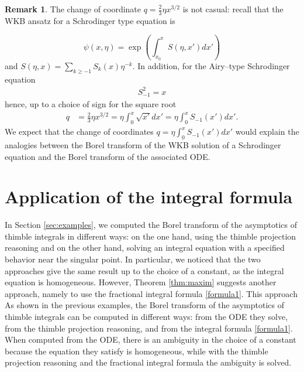 \documentclass{article}
\theoremstyle{definition}
\newtheorem{remark}[definition]{Remark}
\begin{document}
\begin{remark}
The change of coordinate $q=\frac{2}{3}\eta x^{3/2}$ is not casual: recall that the WKB ansatz for a Schrodinger type equation is

\begin{equation}
\psi(x,\eta)=\exp\left(\int_{x_0}^xS(\eta,x')dx'\right)
\end{equation} 
 and $S(\eta,x)=\sum_{k\geq -1}S_k(x)\eta^{-k}$. In addition, for the Airy--type Schrodinger equation 
 \begin{align*}
 S_{-1}^2=x
 \end{align*}
hence, up to a choice of sign for the square root
\begin{align*}
q&=\frac{2}{3}\eta x^{3/2}=\eta\int_0^x\sqrt{x'}dx'=\eta\int_{0}^xS_{-1}(x')dx'.
\end{align*}
We expect that the change of coordinates $q=\eta\int_0^{x}S_{-1}(x')dx'$ would explain the analogies between the Borel transform of the WKB solution of a Schrodinger equation and the Borel transform of the associated ODE.  
\end{remark} 

\section{Application of the integral formula}

In Section \ref{sec:examples}, we computed the Borel transform of the asymptotics of thimble integrals in different ways: on the one hand, using the thimble projection reasoning and on the other hand, solving an integral equation with a specified behavior near the singular point. In particular, we noticed that the two approaches give the same result up to the choice of a constant, as the integral equation is homogeneous. However, Theorem \ref{thm:maxim} suggests another approach, namely to use the fractional integral formula \eqref{formula1}. This approach  
As shown in the previous examples, the Borel transform  of the asymptotics of thimble integrals can be computed in different ways: from the ODE they solve, from the thimble projection reasoning, and from the integral formula \eqref{formula1}. When computed from the ODE, there is an ambiguity in the choice of a constant because the equation they satisfy is homogeneous, while with the thimble projection reasoning and the fractional integral formula the ambiguity is solved.

\end{document}
